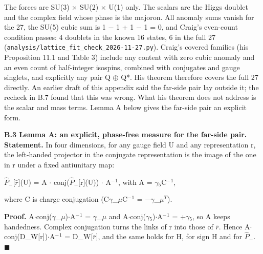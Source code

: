 \documentclass[
  11pt,
]{article}
\begin{document}
The forces are SU(3) \ensuremath{\times} SU(2) \ensuremath{\times} U(1) only. The scalars are the Higgs doublet and the complex field whose phase is the majoron. All anomaly sums vanish for the 27, the SU(5) cubic sum is 1 \ensuremath{-} 1 + 1 \ensuremath{-} 1 = 0, and Craig's even-count condition passes: 4 doublets in the known 16 states, 6 in the full 27 (\texttt{analysis/lattice\_fit\_check\_2026-11-27.py}). Craig's covered families (his Proposition 11.1 and Table 3) include any content with zero cubic anomaly and an even count of half-integer isospins, combined with conjugates and gauge singlets, and explicitly any pair Q \ensuremath{\oplus} Q*. His theorem therefore covers the full 27 directly. An earlier draft of this appendix said the far-side pair lay outside it; the recheck in B.7 found that this was wrong. What his theorem does not address is the scalar and mass terms. Lemma A below gives the far-side pair an explicit form.

\textbf{B.3 Lemma A: an explicit, phase-free measure for the far-side pair.} \textbf{Statement.} In four dimensions, for any gauge field U and any representation r, the left-handed projector in the conjugate representation is the image of the one in r under a fixed antiunitary map:

\ensuremath{\hat{P}}\ensuremath{_{-}}{[}\ensuremath{\bar{r}}{]}(U) = A \ensuremath{\cdot} conj(\ensuremath{\hat{P}}\ensuremath{_{-}}{[}r{]}(U)) \ensuremath{\cdot} A\ensuremath{^{-}}\ensuremath{^{1}}, with A = \ensuremath{\gamma}\ensuremath{_{5}}C\ensuremath{^{-}}\ensuremath{^{1}},

where C is charge conjugation (C\ensuremath{\gamma}\_\ensuremath{\mu}C\ensuremath{^{-}}\ensuremath{^{1}} = \ensuremath{-}\ensuremath{\gamma}\_\ensuremath{\mu}\ensuremath{^{T}}).

\textbf{Proof.} A\ensuremath{\cdot}conj(\ensuremath{\gamma}\_\ensuremath{\mu})\ensuremath{\cdot}A\ensuremath{^{-}}\ensuremath{^{1}} = \ensuremath{\gamma}\_\ensuremath{\mu} and A\ensuremath{\cdot}conj(\ensuremath{\gamma}\ensuremath{_{5}})\ensuremath{\cdot}A\ensuremath{^{-}}\ensuremath{^{1}} = +\ensuremath{\gamma}\ensuremath{_{5}}, so A keeps handedness. Complex conjugation turns the links of r into those of \ensuremath{\bar{r}}. Hence A\ensuremath{\cdot}conj(D\_W{[}r{]})\ensuremath{\cdot}A\ensuremath{^{-}}\ensuremath{^{1}} = D\_W{[}\ensuremath{\bar{r}}{]}, and the same holds for H, for sign H and for \ensuremath{\hat{P}}\ensuremath{_{-}}. \ensuremath{\blacksquare}
\end{document}
